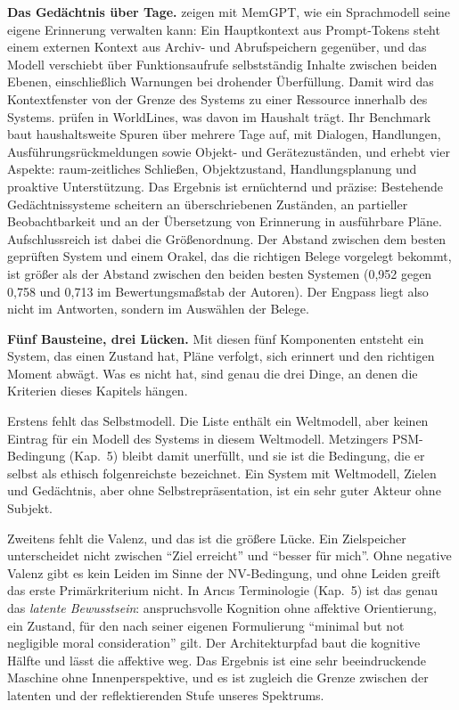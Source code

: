 \documentclass[acmlarge, noacm]{acmart}
\begin{document}
\textbf{Das Gedächtnis über Tage.} \citet{packer2024} zeigen mit MemGPT, wie ein Sprachmodell seine eigene Erinnerung verwalten kann: Ein Hauptkontext aus Prompt-Tokens steht einem externen Kontext aus Archiv- und Abrufspeichern gegenüber, und das Modell verschiebt über Funktionsaufrufe selbstständig Inhalte zwischen beiden Ebenen, einschließlich Warnungen bei drohender Überfüllung. Damit wird das Kontextfenster von der Grenze des Systems zu einer Ressource innerhalb des Systems. \citet{zhang2026} prüfen in WorldLines, was davon im Haushalt trägt. Ihr Benchmark baut haushaltsweite Spuren über mehrere Tage auf, mit Dialogen, Handlungen, Ausführungsrückmeldungen sowie Objekt- und Gerätezuständen, und erhebt vier Aspekte: raum-zeitliches Schließen, Objektzustand, Handlungsplanung und proaktive Unterstützung. Das Ergebnis ist ernüchternd und präzise: Bestehende Gedächtnissysteme scheitern an überschriebenen Zuständen, an partieller Beobachtbarkeit und an der Übersetzung von Erinnerung in ausführbare Pläne. Aufschlussreich ist dabei die Größenordnung. Der Abstand zwischen dem besten geprüften System und einem Orakel, das die richtigen Belege vorgelegt bekommt, ist größer als der Abstand zwischen den beiden besten Systemen (0,952 gegen 0,758 und 0,713 im Bewertungsmaßstab der Autoren). Der Engpass liegt also nicht im Antworten, sondern im Auswählen der Belege.

\textbf{Fünf Bausteine, drei Lücken.} Mit diesen fünf Komponenten entsteht ein System, das einen Zustand hat, Pläne verfolgt, sich erinnert und den richtigen Moment abwägt. Was es nicht hat, sind genau die drei Dinge, an denen die Kriterien dieses Kapitels hängen.

Erstens fehlt das Selbstmodell. Die Liste enthält ein Weltmodell, aber keinen Eintrag für ein Modell des Systems in diesem Weltmodell. Metzingers PSM-Bedingung (Kap.~5) bleibt damit unerfüllt, und sie ist die Bedingung, die er selbst als ethisch folgenreichste bezeichnet. Ein System mit Weltmodell, Zielen und Gedächtnis, aber ohne Selbstrepräsentation, ist ein sehr guter Akteur ohne Subjekt.

Zweitens fehlt die Valenz, und das ist die größere Lücke. Ein Zielspeicher unterscheidet nicht zwischen ``Ziel erreicht'' und ``besser für mich''. Ohne negative Valenz gibt es kein Leiden im Sinne der NV-Bedingung, und ohne Leiden greift das erste Primärkriterium nicht. In Arıcıs Terminologie (Kap.~5) ist das genau das \emph{latente Bewusstsein}: anspruchsvolle Kognition ohne affektive Orientierung, ein Zustand, für den nach seiner eigenen Formulierung ``minimal but not negligible moral consideration'' gilt. Der Architekturpfad baut die kognitive Hälfte und lässt die affektive weg. Das Ergebnis ist eine sehr beeindruckende Maschine ohne Innenperspektive, und es ist zugleich die Grenze zwischen der latenten und der reflektierenden Stufe unseres Spektrums.
\end{document}
